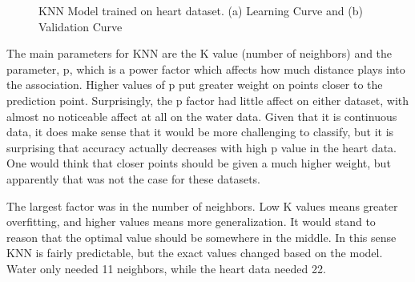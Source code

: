 \documentclass[
	letterpaper, %
]{mlreport}
\begin{document}
\begin{figure}
	\centering
	\caption{KNN Model trained on heart dataset. (a) Learning Curve and (b) Validation Curve}
	\label{fig:fig13}
\end{figure}

The main parameters for KNN are the K value (number of neighbors) and the parameter, p, which is a power factor which affects how much distance plays into the association. Higher values of p put greater weight on points closer to the prediction point. Surprisingly, the p factor had little affect on either dataset, with almost no noticeable affect at all on the water data. Given that it is continuous data, it does make sense that it would be more challenging to classify, but it is surprising that accuracy actually decreases with high p value in the heart data. One would think that closer points should be given a much higher weight, but apparently that was not the case for these datasets.

The largest factor was in the number of neighbors. Low K values means greater overfitting, and higher values means more generalization. It would stand to reason that the optimal value should be somewhere in the middle. In this sense KNN is fairly predictable, but the exact values changed based on the model. Water only needed 11 neighbors, while the heart data needed 22.
\end{document}
